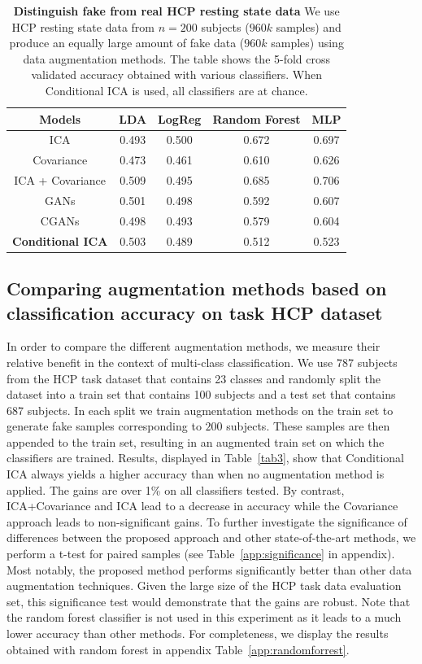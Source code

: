 \begin{table}
\begin{center}
\begin{tabular}{c|cccc}
\hline
Models & LDA  & LogReg & Random Forest &  MLP 
\\ \hline
ICA   & 0.493 & 0.500 & 0.672 &  0.697
\\
Covariance   & 0.473 & 0.461 & 0.610 &  0.626
\\
ICA + Covariance   & 0.509 & 0.495 & 0.685 &  0.706
\\
GANs   & 0.501 & 0.498 & 0.592 &  0.607
\\
CGANs   & 0.498 &  0.493 & 0.579 & 0.604
\\\hline
\textbf{Conditional ICA}  & 0.503 & 0.489 & 0.512 &  0.523
\\\hline\hline
\end{tabular}
\end{center}
  \caption{\textbf{Distinguish fake from real HCP resting state data}
    We use HCP resting state data from $n=200$ subjects ($960k$ samples) and produce an equally
    large amount of fake data ($960k$ samples) using data augmentation methods.
    The table shows the 5-fold cross validated accuracy obtained with various
    classifiers. When Conditional ICA is used, all classifiers are at chance.
    }\label{tab2}
\end{table}
%
\subsection{Comparing augmentation methods based on classification accuracy on task
  HCP dataset}
In order to compare the different augmentation methods, we measure their 
relative benefit in the context of multi-class classification.
We use 787 subjects from the HCP task dataset that contains 23 classes and
randomly split the dataset into a train set that contains 100 subjects and a test set
that contains 687 subjects. In each split we train augmentation methods on the
train set to generate fake samples corresponding to $200$ subjects.  
These samples are then appended to the train set, resulting in an
augmented train set on which the classifiers are trained. Results, displayed in Table~\ref{tab3}, show that Conditional ICA always yields a higher accuracy  than when no augmentation method is applied. The gains are over 1\% on all classifiers tested. 
%
By contrast, ICA+Covariance and ICA lead to a decrease in accuracy
while the Covariance approach leads to non-significant
gains.
%
To further investigate the significance of differences between the proposed approach and other state-of-the-art methods, we perform a t-test for paired samples (see Table~\ref{app:significance} in appendix). Most notably, the proposed method performs significantly better than other data augmentation techniques. Given the large size of the HCP task data evaluation set, this significance test would demonstrate that the gains are robust.
%
Note that the random forest classifier is not used in this experiment as it leads to a much lower accuracy than other methods. For completeness, we display the results obtained with random forest in appendix Table~\ref{app:randomforrest}.

